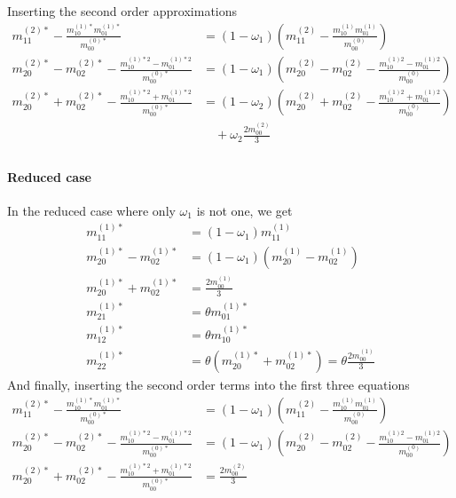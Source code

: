 Inserting the second order approximations
\begin{equation}
  \begin{aligned}
    m_{11}^{(2)*} - \frac{ m_{10}^{(1)*}m_{01}^{(1)*}}{m_{00}^{(0)*}} & = (1-\omega_1)\left(m_{11}^{(2)} - \frac{ m_{10}^{(1)}m_{01}^{(1)}}{m_{00}^{(0)}}\right) \\
    m_{20}^{(2)*}-m_{02}^{(2)*} - \frac{ m_{10}^{(1)*2} - m_{01}^{(1)*2}}{m_{00}^{(0)*}} & = (1-\omega_1) \left(m_{20}^{(2)}-m_{02}^{(2)} - \frac{ m_{10}^{(1)2} - m_{01}^{(1)2}}{m_{00}^{(0)}}\right) \\
    m_{20}^{(2)*}+m_{02}^{(2)*} - \frac{ m_{10}^{(1)*2} + m_{01}^{(1)*2}}{m_{00}^{(0)*}} & = (1-\omega_2)
    \left(m_{20}^{(2)}+m_{02}^{(2)} - \frac{ m_{10}^{(1)2} + m_{01}^{(1)2}}{m_{00}^{(0)}}\right)
    \\&\quad
    + \omega_2 \frac{2 m_{00}^{(2)}}{3} \\
  \end{aligned}
\end{equation}

\paragraph{Reduced case}
\label{par:Reduced case}
In the reduced case where only $\omega_1$ is not one, we get
\begin{equation}
  \begin{aligned}
    m_{11}^{(1)*} & = (1-\omega_1) m_{11}^{(1)} \\
    m_{20}^{(1)*} - m_{02}^{(1)*}
      & = (1-\omega_1) (m_{20}^{(1)} - m_{02}^{(1)}) \\
    m_{20}^{(1)*} + m_{02}^{(1)*}
      & =  \frac{2 m_{00}^{(1)}}{3} \\
    m_{21}^{(1)*} & = \theta m_{01}^{(1)*} \\
    m_{12}^{(1)*} & = \theta m_{10}^{(1)*} \\
    m_{22}^{(1)*} & = \theta (m_{20}^{(1)*} + m_{02}^{(1)*}) = \theta \frac{2 m_{00}^{(1)}}{3}
  \end{aligned}
\end{equation}
And finally, inserting the second order terms into the first three equations
\begin{equation}
  \begin{aligned}
    m_{11}^{(2)*} - \frac{ m_{10}^{(1)*}m_{01}^{(1)*}}{m_{00}^{(0)*}} & = (1-\omega_1)\left(m_{11}^{(2)} - \frac{ m_{10}^{(1)}m_{01}^{(1)}}{m_{00}^{(0)}}\right) \\
    m_{20}^{(2)*}-m_{02}^{(2)*} - \frac{ m_{10}^{(1)*2} - m_{01}^{(1)*2}}{m_{00}^{(0)*}} & = (1-\omega_1) \left(m_{20}^{(2)}-m_{02}^{(2)} - \frac{ m_{10}^{(1)2} - m_{01}^{(1)2}}{m_{00}^{(0)}}\right) \\
    m_{20}^{(2)*}+m_{02}^{(2)*} - \frac{ m_{10}^{(1)*2} + m_{01}^{(1)*2}}{m_{00}^{(0)*}} & = \frac{2 m_{00}^{(2)}}{3}
  \end{aligned}
\end{equation}

